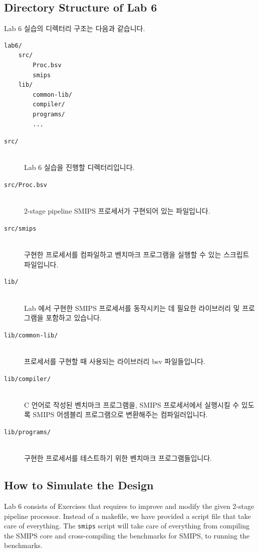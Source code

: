 \documentclass{article}
\begin{document}
\subsection{Directory Structure of Lab 6}
Lab 6 실습의 디렉터리 구조는 다음과 같습니다.

\begin{Verbatim}[frame=single]
lab6/
    src/	
        Proc.bsv
        smips
    lib/
        common-lib/
        compiler/
        programs/
        ...
\end{Verbatim}

\begin{description}
\item [\texttt{src/}]\hfill \ \\
	Lab 6 실습을 진행할 디렉터리입니다.

\item [\texttt{src/Proc.bsv}]\hfill \ \\
	2-stage pipeline SMIPS 프로세서가 구현되어 있는 파일입니다.

\item [\texttt{src/smips}]\hfill \ \\
	구현한 프로세서를 컴파일하고 벤치마크 프로그램을 실행할 수 있는 스크립트 파일입니다.

\item [\texttt{lib/}]\hfill \ \\
	Lab 에서 구현한 SMIPS 프로세서를 동작시키는 데 필요한 라이브러리 및 프로그램을 포함하고 있습니다.

\item [\texttt{lib/common-lib/}]\hfill \ \\
	프로세서를 구현할 때 사용되는 라이브러리 bsv 파일들입니다.

\item [\texttt{lib/compiler/}]\hfill \ \\
	C 언어로 작성된 벤치마크 프로그램을, SMIPS 프로세서에서 실행시킬 수 있도록 
	SMIPS 어셈블리 프로그램으로 변환해주는 컴파일러입니다.

\item [\texttt{lib/programs/}]\hfill \ \\ 
	구현한 프로세서를 테스트하기 위한 벤치마크 프로그램들입니다.

\end{description}

\subsection{How to Simulate the Design}
Lab 6 consists of Exercises that requires to improve and modify the given 2-stage pipeline processor.
Instead of a makefile, we have provided a script file that take care of everything. 
The \texttt{smips} script will take care of everything from compiling
the SMIPS core and cross-compiling the benchmarks for SMIPS, to running the benchmarks.
\end{document}
